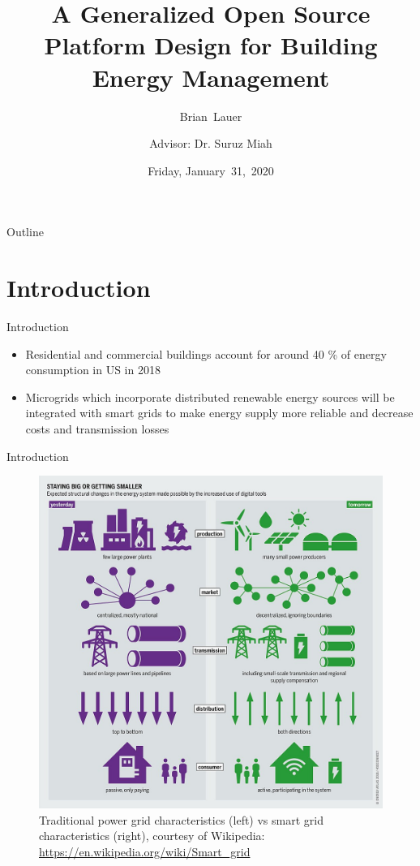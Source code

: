 \documentclass{beamer}
\title[]{A Generalized Open Source Platform Design for Building Energy Management}
\author[B.~Lauer]{Brian~Lauer\\\and
Advisor: Dr. Suruz Miah}
\institute[Bradley University] %
{
  Department of Electrical and Computer Engineering\\
  Bradley University\\
  1501 W. Bradley Avenue\\
  Peoria, IL, 61625, USA
}
\date[Friday~31,~2020]{Friday, January~31,~2020}
\begin{document}
\begin{frame}
  \titlepage
\end{frame}

\begin{frame}{Outline}
  \tableofcontents
\end{frame}

\section{Introduction}

\begin{frame}{Introduction}{}
  	\begin{itemize}
  		\item Residential and commercial buildings account for around 40 \% of energy consumption in US in 2018
  		\item Microgrids which incorporate distributed renewable energy sources will be integrated with smart grids to make energy supply more reliable and decrease costs and transmission losses
  	\end{itemize}
\end{frame}

\begin{frame}{Introduction}{}
\begin{figure}
\includegraphics[scale=0.18]{figs/img/microgridsAndSmartgrids}
\caption{Traditional power grid characteristics (left) vs smart grid characteristics (right), courtesy of Wikipedia: \url{https://en.wikipedia.org/wiki/Smart_grid}}
\end{figure}
\end{frame}
\end{document}
